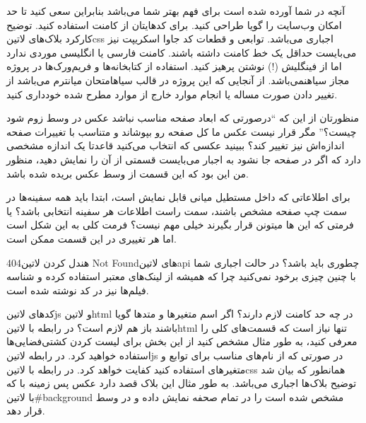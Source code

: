 \documentclass[../main.tex]{subfiles}
\begin{document}

 آنچه در شما آورده شده است برای فهم بهتر شما می‌باشد بنابراین سعی کنید تا حد امکان وب‌سایت را گویا طراحی کنید.
 برای کدهایتان از کامنت استفاده کنید. توضیح کارکرد بلاک‌های ‌لاتین{css} اجباری می‌باشد. توابعی و قطعات کد جاوا اسکریپت نیز می‌بایست حداقل یک خط کامنت داشته باشند.
 کامنت فارسی یا انگلیسی موردی ندارد اما از فینگلیش (!) نوشتن پرهیز کنید.
 استفاده از کتابخانه‌ها و فریم‌ورک‌ها در پروژه مجاز ‌سیاه{نمی‌باشد}.
 از آنجایی که این پروژه در قالب ‌سیاه{امتحان میانترم} می‌باشد از تغییر دادن صورت مساله یا انجام موارد خارج از موارد مطرح شده خودداری کنید.


 منظورتان از این که ``درصورتی که ابعاد صفحه مناسب نباشد عکس در وسط زوم شود چیست؟''
مگر قرار نیست عکس ما کل صفحه رو بپوشاند و متناسب با تغییرات صفحه اندازه‌اش نیز تغییر کند؟
 ببینید عکسی که انتخاب می‌کنید قاعدتا یک اندازه مشخصی دارد که اگر در صفحه جا نشود به اجبار می‌بایست
قسمتی از آن را نمایش دهید، منظور من این بود که این قسمت از وسط عکس بریده شده باشد.

 برای اطلاعاتی که داخل مستطیل میانی قابل نمایش است،
ابتدا باید همه سفینه‌ها در سمت چپ صفحه مشخص باشند، سمت راست اطلاعات هر سفینه انتخابی باشد؟ یا فرمتی که این ها میتونن قرار بگیرند خیلی مهم نیست؟
 فرمت کلی به این شکل است اما هر تغییری در این قسمت ممکن است.

 هندل کردن ‌لاتین{404 Not Found}های ‌لاتین{api} چطوری باید باشد؟
 در حالت اجباری شما با چنین چیزی برخود نمی‌کنید چرا که همیشه از لینک‌های معتبر استفاده کرده
و شناسه فیلم‌ها نیز در کد نوشته شده است.

 کدهای ‌لاتین{js} و ‌لاتین{html} در چه حد کامنت لازم دارند؟ اگر اسم متغیرها و متدها گویا باشند باز هم لازم است؟
 در رابطه با ‌لاتین{html} تنها نیاز است که قسمت‌های کلی را معرفی کنید،
به طور مثال مشخص کنید از این بخش برای لیست کردن کشتی‌فضایی‌ها استفاده خواهید کرد.
در رابطه ‌لاتین{js} در صورتی که از نام‌های مناسب برای توابع و متغیرهای استفاده کنید کفایت خواهد کرد.
در رابطه با ‌لاتین{css} همانطور که بیان شد توضیح بلاک‌ها اجباری می‌باشد.
به طور مثال این بلاک قصد دارد عکس پس زمینه با که با ‌لاتین{\#background} مشخص شده است را در تمام صحفه نمایش داده و در وسط قرار دهد.

\end{document}
